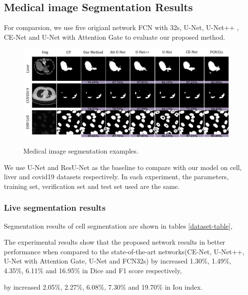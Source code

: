 \documentclass{ieeeaccess}
\begin{document}
  \subsection{Medical image Segmentation Results}
  For comparsion, we use five origianl network FCN with 32s\cite{fcn}, U-Net\cite{unet}, U-Net++\cite{LiTCLGJW20} , CE-Net\cite{cenet} and U-Net with Attention Gate\cite{attentiongate}
  to evaluate our proposed method. 
  \begin{figure}[htbp]
    \begin{center}
    \includegraphics[width=1\textwidth]{figure/result.pdf}
    \vspace{-2mm}
    \caption{Medical image segmentation examples.} 
    \vspace{-2mm}
    \label{fig:result}
    \end{center}
    \vspace{-0.35cm}
  \end{figure}
  
  We use U-Net and ResU-Net as the baseline to compare with our model on cell, liver and covid19 datasets respectively. In each experiment, the parameters, training set, verification set and test set used are the same.
  
  
  \subsubsection{Live segmentation results}
  Segmentation results of cell segmentation are shown in tables \ref{dataset-table}, 
  
  The experimental results show that the proposed network results in better performance when compared to the state-of-the-art networks(CE-Net, U-Net++, U-Net with Attention Gate, U-Net and FCN32s) by increased 1.30\%, 1.49\%, 4.35\%, 6.11\% and 16.95\% in Dice and F1 score respectively, 
  
  by increased 2.05\%, 2.27\%, 6.08\%, 7.30\% and 19.70\% in Iou index.
  
\end{document}

